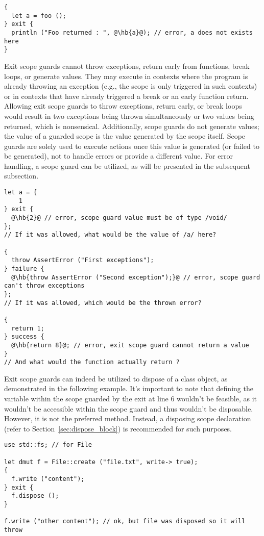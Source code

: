 \begin{lstlisting}[style=coloredverbatim, escapechar=@]
{
  let a = foo ();
} exit {
  println ("Foo returned : ", @\hb{a}@); // error, a does not exists here
}
\end{lstlisting}

Exit scope guards cannot throw exceptions, return early from functions, break
loops, or generate values. They may execute in contexts where the program is
already throwing an exception (e.g., the  scope is only triggered
in such contexts) or in contexts that have already triggered a break or an early
function return. Allowing exit scope guards to throw exceptions, return early,
or break loops would result in two exceptions being thrown simultaneously or two
values being returned, which is nonsensical. Additionally, scope guards do not
generate values; the value of a guarded scope is the value generated by the
scope itself. Scope guards are solely used to execute actions once this value is
generated (or failed to be generated), not to handle errors or provide a
different value. For error handling, a  scope guard can be
utilized, as will be presented in the subsequent subsection.

\begin{lstlisting}[style=coloredverbatim, escapechar=@]
let a = {
    1
} exit {
  @\hb{2}@ // error, scope guard value must be of type /void/
};
// If it was allowed, what would be the value of /a/ here?

{
  throw AssertError ("First exceptions");
} failure {
  @\hb{throw AssertError ("Second exception");}@ // error, scope guard can't throw exceptions
};
// If it was allowed, which would be the thrown error?

{
  return 1;
} success {
  @\hb{return 8}@; // error, exit scope guard cannot return a value
}
// And what would the function actually return ?
\end{lstlisting}

Exit scope guards can indeed be utilized to dispose of a class object, as
demonstrated in the following example. It's important to note that defining the
variable  within the scope guarded by the exit at line 6 wouldn't be
feasible, as it wouldn't be accessible within the scope guard and thus wouldn't
be disposable. However, it is not the preferred method. Instead, a disposing
scope declaration (refer to Section~\ref{sec:dispose_block}) is recommended for
such purposes.

\begin{lstlisting}[style=coloredverbatim]
use std::fs; // for File

let dmut f = File::create ("file.txt", write-> true);
{
  f.write ("content");
} exit {
  f.dispose ();
}

f.write ("other content"); // ok, but file was disposed so it will throw
\end{lstlisting}

